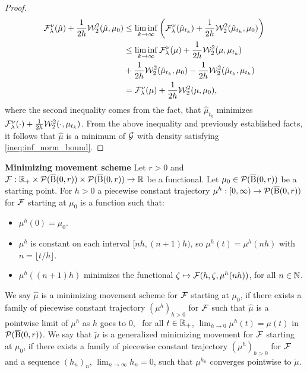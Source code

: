 \begin{proof}
\[
\begin{aligned}
\mathcal{F}^{\nu}_{\lambda}(\hat{\mu}) + \frac{1}{2h} {\cal W}_2^2(\hat{\mu}, \mu_0)  & \leq \liminf_{k \rightarrow \infty} \left( \mathcal{F}^{\nu}_{\lambda}(\hat{\mu}_{t_k}) + \frac{1}{2h} {\cal W}_2^2(\hat{\mu}_{t_k} , \mu_0) \right) \\
& \leq \liminf_{k \rightarrow \infty}  \mathcal{F}^{\nu}_{\lambda}(\mu) + \frac{1}{2h} {\cal W}_2^2(\mu , \mu_{t_k})   \\
& + \frac{1}{2h}  {\cal W}_2^2(\hat{\mu}_{t_k}, \mu_0) - \frac{1}{2h} {\cal W}_2^2(\hat{\mu}_{t_k}, \mu_{t_k})   \\
& = \mathcal{F}^{\nu}_{\lambda} (\mu) + \frac{1}{2h} {\cal W}_2^2(\mu, \mu_0) ,
\end{aligned}
\]
where the second inequality comes from the fact, that $\hat{\mu}_{t_k}$ minimizes $\mathcal{F}^{\nu}_{\lambda}(\cdot) + \frac{1}{2h}{\cal W}_2^2(\cdot, \mu_{t_k})$. From the above inequality and previously established facts, it follows that $\hat{\mu}$ is a minimum of $\mathcal{G}$ with density satisfying \ref{ineq:inf_norm_bound}.
\end{proof}

\begin{definition} \textbf{Minimizing movement scheme}
  \label{def:mini_move}
Let $r >0$ and  $\mathcal{F} : \mathbb{R_+} \times {\cal P}(\operatorname{\overline{B}}(0,r)) \times {\cal P}(\operatorname{\overline{B}}(0,r))\rightarrow \mathbb{R}$ be a functional. Let $\mu_0 \in {\cal P}(\operatorname{\overline{B}}(0,r))$ be a starting point. For $h> 0$ a piecewise constant trajectory $\mu^h : [0, \infty) \rightarrow {\cal P}(\operatorname{\overline{B}}(0,r))$ for $\mathcal{F}$ starting at $\mu_0$ is a function such that:
\begin{itemize}
\item $\mu^h(0) = \mu_0$.
\item $\mu^h$ is constant on each interval $[nh, (n+1)h)$, so $\mu^h(t) = \mu^h(nh)$ with $n = \lfloor t/h \rfloor$.
\item $\mu^h((n+1)h )$ minimizes the  functional $ \zeta  \mapsto \mathcal{F}(h,  \zeta ,\mu^h(nh))$, for all $n \in \mathbb{N}$.
\end{itemize}
We say $\hat{\mu}$ is a minimizing movement scheme for $\mathcal{F}$ starting at $\mu_0$, if there exists a family of piecewise constant trajectory $(\mu^h)_{h >0}$ for $\mathcal{F}$ such that $\hat{\mu}$ is a pointwise limit of $\mu^h$ as $h$ goes to $0$, \ie~for all $t \in \mathbb{R}_+$, $\lim_{h \to 0} \mu^h(t) = \mu(t)$ in ${\cal P}(\operatorname{\overline{B}}(0,r))$. We say that $\tilde{\mu}$ is a generalized minimizing movement for  $\mathcal{F}$ starting at $\mu_0$, if there exists a family of piecewise constant trajectory $(\mu^h)_{h >0}$ for $\mathcal{F}$ and  a sequence $(h_n)_n$, $\lim_{n \to \infty} h_n = 0$, such that $\mu^{h_n}$ converges pointwise to $\tilde{\mu}$.
\end{definition}


